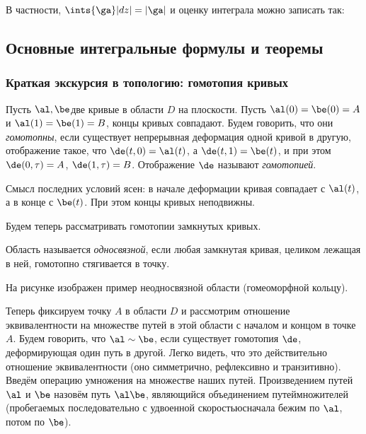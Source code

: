 \documentclass[a4paper]{article}
\begin{document}
В частности, $\ints{\ga}|dz|= |\ga|$ и оценку интеграла можно записать так:


\subsection{Основные интегральные формулы и теоремы}

\subsubsection{Краткая экскурсия в топологию: гомотопия кривых}

\begin{df}
Пусть $\al, \be$\т две кривые в области $D$ на плоскости. Пусть $\al(0)=\be(0)=A$ и
$\al(1)=\be(1)=B$,  концы кривых совпадают. Будем говорить, что они \emph{гомотопны}, если существует
непрерывная деформация одной кривой в другую,  отображение  такое, что $\de(t,0)=\al(t)$, а $\de(t,1)=\be(t)$, и при этом $\de(0,\tau)=A$,
$\de(1,\tau)=B$. Отображение $\de$ называют \emph{гомотопией}.
\end{df}

Смысл последних условий ясен: в начале деформации кривая совпадает с $\al(t)$, а в конце\т
с $\be(t)$. При этом концы кривых неподвижны.

Будем теперь рассматривать гомотопии замкнутых кривых.

\begin{df}
Область называется \emph{односвязной}, если любая замкнутая кривая, целиком лежащая в ней, гомотопно
стягивается в точку.
\end{df}
На рисунке изображен пример неодносвязной области (гомеоморфной кольцу).

Теперь фиксируем точку $A$ в области $D$ и рассмотрим отношение эквивалентности на
множестве путей в этой области с началом и концом в точке $A$. Будем говорить, что $\al \sim \be$, если
существует гомотопия $\de$, деформирующая один путь в другой. Легко видеть, что это действительно отношение
эквивалентности (оно симметрично, рефлексивно и транзитивно). Введём операцию умножения на множестве наших
путей. Произведением путей $\al$ и $\be$ назовём путь $\al\be$, являющийся объединением путей\д множителей
(пробегаемых последовательно с удвоенной скоростью\т сначала бежим по $\al$, потом по $\be$).
\end{document}
